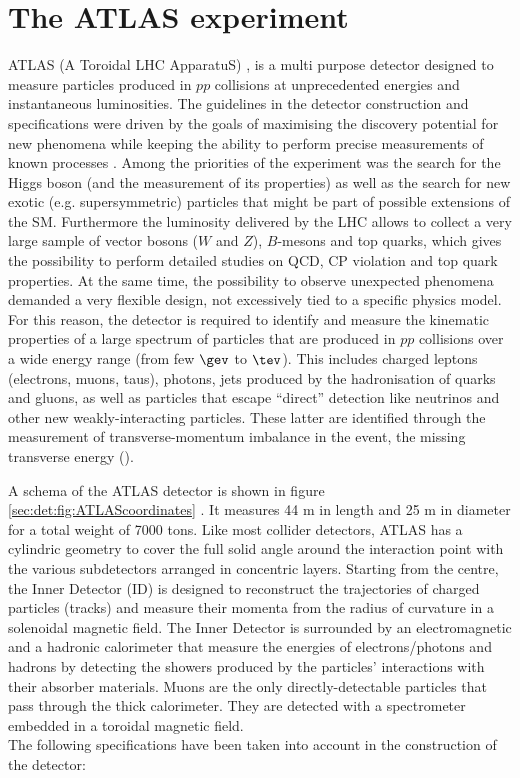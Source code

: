 \section{The ATLAS experiment}
\label{chp:det:ATLAS}

ATLAS (A Toroidal LHC ApparatuS) \cite{ATLASjinst}, is a multi purpose detector designed to measure particles produced in $pp$ collisions at unprecedented energies and instantaneous luminosities. The guidelines in the detector construction and specifications were driven by the goals of maximising the discovery potential for new phenomena while keeping the ability to perform precise measurements of known processes \cite{ATLASTDR1}. Among the priorities of the experiment was the search for the Higgs boson (and the measurement of its properties) as well as the search for new exotic (e.g. supersymmetric) particles that might be part of possible extensions of the SM. Furthermore the luminosity delivered by the LHC allows to collect a very large sample of vector bosons ($W$ and $Z$), $B$-mesons and top quarks, which gives the possibility to perform detailed studies on QCD, CP violation and top quark properties. At the same time, the possibility to observe unexpected phenomena demanded a very flexible design, not excessively tied to a specific physics model. For this reason, the detector is required to identify and measure the kinematic properties of a large spectrum of particles that are produced in $pp$ collisions over a wide energy range (from few $\gev$ to $\tev$). This includes charged leptons (electrons, muons, taus), photons, jets produced by the hadronisation of quarks and gluons, as well as particles that escape ``direct'' detection like neutrinos and other new weakly-interacting particles. These latter are identified through the measurement of transverse-momentum imbalance in the event, the missing transverse energy (\MET).\par
A schema of the ATLAS detector is shown in figure \ref{sec:det:fig:ATLAScoordinates} . It measures 44 m in length and 25 m in diameter for a total weight of 7000 tons. Like most collider detectors, ATLAS has a cylindric geometry to cover the full solid angle around the interaction point with the various subdetectors arranged in concentric layers. Starting from the centre, the Inner Detector (ID) is designed to reconstruct the trajectories of charged particles (tracks) and measure their momenta from the radius of curvature in a solenoidal magnetic field. The Inner Detector is surrounded by an electromagnetic and a hadronic calorimeter that measure the energies of electrons/photons and hadrons by detecting the showers produced by the particles' interactions with their absorber materials. Muons are the only directly-detectable particles that pass through the thick calorimeter. They are detected with a spectrometer embedded in a toroidal magnetic field.\\ The following specifications have been taken into account in the construction of the detector:
